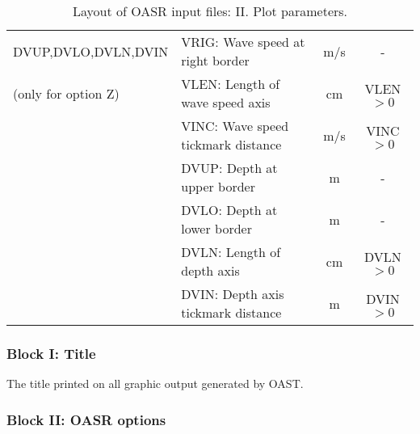 \begin{table}
\begin{tabular}{|l|l|c|c|}
DVUP,DVLO,DVLN,DVIN & VRIG: Wave speed at right border & m/s & - \\
(only for option Z) & VLEN: Length of wave speed axis & cm & VLEN$>0$ \\
		& VINC: Wave speed tickmark distance & m/s & VINC$>0$ \\
		& DVUP: Depth at upper border  & m & - \\
		& DVLO: Depth at lower border  & m & - \\
		& DVLN: Length of depth axis   & cm & DVLN$>0$ \\
		& DVIN: Depth axis tickmark distance & m & DVIN$>0$ \\
\hline
\end{tabular}
\caption{Layout of OASR input files: II. Plot parameters.
	\label{tab:oasrII} }
\end{table} 

\subsubsection{Block I: Title}

The title printed on all graphic output generated by OAST.

\subsubsection{Block II: OASR options}


